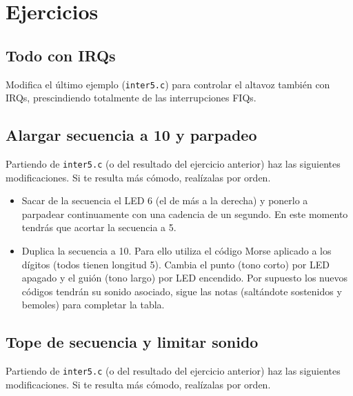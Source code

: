 \section{Ejercicios}

\subsection{Todo con IRQs}

Modifica el último ejemplo ({\tt inter5.c}) para controlar el altavoz también con IRQs,
prescindiendo totalmente de las interrupciones FIQs.

\subsection{Alargar secuencia a 10 y parpadeo}

Partiendo de {\tt inter5.c} (o del resultado del ejercicio anterior) haz las siguientes
modificaciones. Si te resulta más cómodo, realízalas por orden.

\begin{itemize}
  \item Sacar de la secuencia el LED 6 (el de más a la derecha) y ponerlo a parpadear
        continuamente con una cadencia de un segundo. En este momento tendrás que acortar
        la secuencia a 5.
  \item Duplica la secuencia a 10. Para ello utiliza el código Morse aplicado a los dígitos
        (todos tienen longitud 5). Cambia el punto (tono corto) por LED apagado y el guión
        (tono largo) por LED encendido. Por supuesto los nuevos códigos tendrán su sonido
        asociado, sigue las notas (saltándote sostenidos y bemoles) para completar la tabla.
\end{itemize}

\subsection{Tope de secuencia y limitar sonido}

Partiendo de {\tt inter5.c} (o del resultado del ejercicio anterior) haz las siguientes
modificaciones. Si te resulta más cómodo, realízalas por orden.

